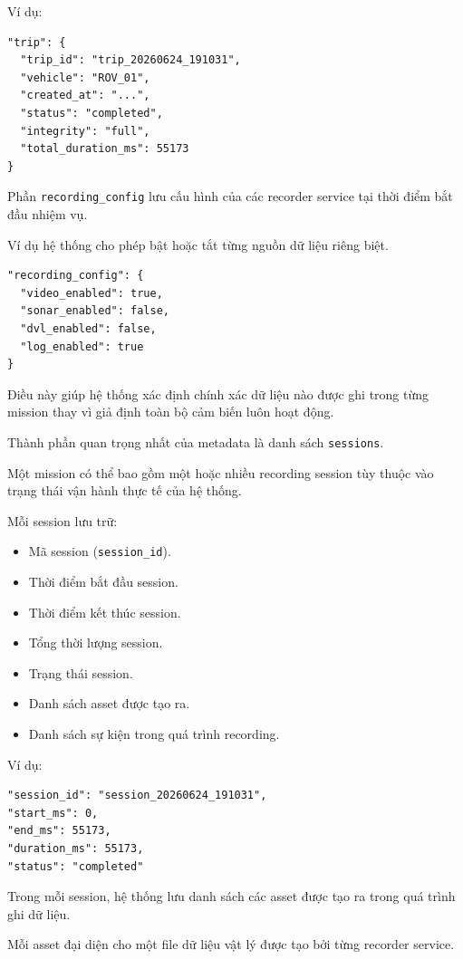 \documentclass[../DoAn.tex]{subfiles}
\begin{document}
Ví dụ:

\begin{verbatim}
"trip": {
  "trip_id": "trip_20260624_191031",
  "vehicle": "ROV_01",
  "created_at": "...",
  "status": "completed",
  "integrity": "full",
  "total_duration_ms": 55173
}
\end{verbatim}

Phần \texttt{recording\_config} lưu cấu hình của các recorder service tại thời điểm bắt đầu nhiệm vụ.

Ví dụ hệ thống cho phép bật hoặc tắt từng nguồn dữ liệu riêng biệt.

\begin{verbatim}
"recording_config": {
  "video_enabled": true,
  "sonar_enabled": false,
  "dvl_enabled": false,
  "log_enabled": true
}
\end{verbatim}

Điều này giúp hệ thống xác định chính xác dữ liệu nào được ghi trong từng mission thay vì giả định toàn bộ cảm biến luôn hoạt động.

Thành phần quan trọng nhất của metadata là danh sách \texttt{sessions}.

Một mission có thể bao gồm một hoặc nhiều recording session tùy thuộc vào trạng thái vận hành thực tế của hệ thống.

Mỗi session lưu trữ:

\begin{itemize}
    \item Mã session (\texttt{session\_id}).
    \item Thời điểm bắt đầu session.
    \item Thời điểm kết thúc session.
    \item Tổng thời lượng session.
    \item Trạng thái session.
    \item Danh sách asset được tạo ra.
    \item Danh sách sự kiện trong quá trình recording.
\end{itemize}

Ví dụ:

\begin{verbatim}
"session_id": "session_20260624_191031",
"start_ms": 0,
"end_ms": 55173,
"duration_ms": 55173,
"status": "completed"
\end{verbatim}

Trong mỗi session, hệ thống lưu danh sách các asset được tạo ra trong quá trình ghi dữ liệu.

Mỗi asset đại diện cho một file dữ liệu vật lý được tạo bởi từng recorder service.
\end{document}

